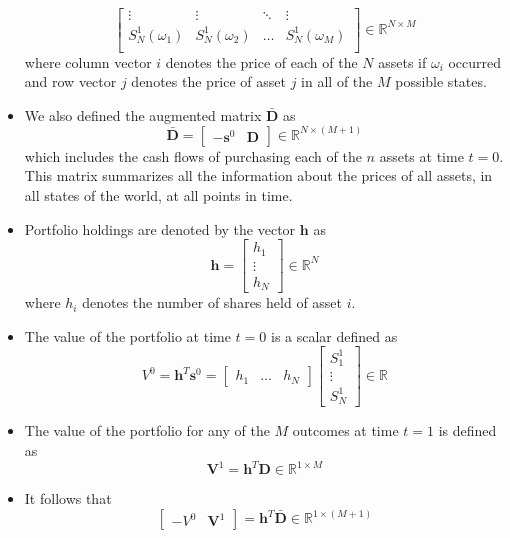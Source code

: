 \documentclass[11pt]{article}
\begin{document}
\begin{itemize}
\[\begin{bmatrix}
        \vdots & \vdots & \ddots & \vdots \\
        S_N^1(\omega_1) & S_N^1(\omega_2) & \hdots & S_N^1(\omega_M) \\
    \end{bmatrix} \in \mathbb{R}^{N \times M}
    \]
    where column vector $i$ denotes the price of each of the $N$ assets if $\omega_i$ occurred
    and row vector $j$ denotes the price of asset $j$ in all of the $M$ possible states.
    \item We also defined the augmented matrix $\bar{\boldsymbol{D}}$ as 
    \[
    \bar{\boldsymbol{D}} = \begin{bmatrix}
        -\boldsymbol{s}^0 & \boldsymbol{D} 
    \end{bmatrix} \in \mathbb{R}^{N \times (M + 1)}
    \] 
    which includes the cash flows of purchasing each of the $n$ assets at time $t=0$. This 
    matrix summarizes all the information about the prices of all assets, in all states of the 
    world, at all points in time. 
    \item Portfolio holdings are denoted by the vector $\boldsymbol{h}$ as 
    \[
    \boldsymbol{h} = \begin{bmatrix}
        h_1 \\
        \vdots \\
        h_N
    \end{bmatrix} \in \mathbb{R}^N
    \]
    where $h_i$ denotes the number of shares held of asset $i$.
    \item The value of the portfolio at time $t=0$ is a scalar defined as 
    \[
    V^0 = \boldsymbol{h}^T \boldsymbol{s}^0 = 
    \begin{bmatrix}
        h_1 & \hdots & h_N
    \end{bmatrix} 
    \begin{bmatrix}
        S_1^1 \\
        \vdots \\ 
        S_N^1
    \end{bmatrix} \in \mathbb{R}
    \]
    \item The value of the portfolio for any of the $M$ outcomes at time $t=1$ is defined as 
    \[
    \boldsymbol{V}^1 = \boldsymbol{h}^T \boldsymbol{D} \in \mathbb{R}^{1 \times M}
    \]
    \item It follows that
    \[
    \begin{bmatrix}
        -V^0 & \boldsymbol{V}^1
    \end{bmatrix} =
    \boldsymbol{h}^T \bar{\boldsymbol{D}} \in \mathbb{R}^{1 \times (M + 1)}
    \]
\end{itemize}
\end{document}
